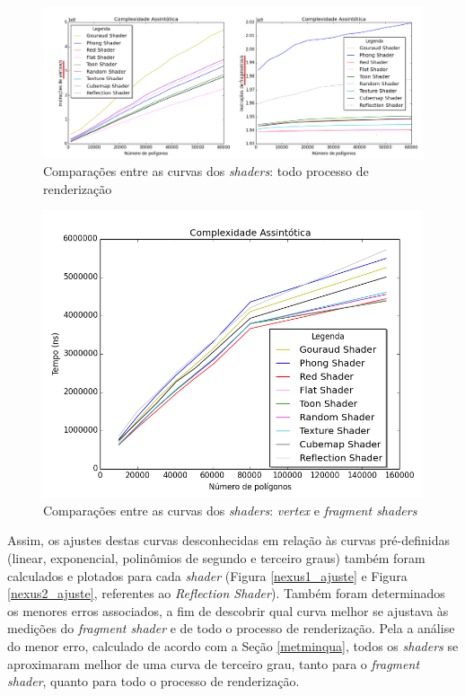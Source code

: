	\begin{figure}[ht]
	\centering
		\includegraphics[keepaspectratio=true,scale=0.4]{figuras/devices_all.png}
	\caption{Comparações entre as curvas dos \textit{shaders}: todo processo de renderização}
	\label{comp_shaders2}
	\end{figure}	

	\begin{figure}[ht]
	\centering
		\includegraphics[keepaspectratio=true,scale=0.5]{figuras/render_time_all.png}
	\caption{Comparações entre as curvas dos \textit{shaders}: \textit{vertex} e \textit{fragment shaders}}
	\label{comp_shaders}
	\end{figure}	


	 Assim, os ajustes destas curvas desconhecidas em relação às curvas pré-definidas (linear, exponencial, polinômios de segundo e terceiro graus) também foram calculados e plotados para cada \textit{shader} (Figura \ref{nexus1_ajuste} e Figura \ref{nexus2_ajuste}, referentes ao \textit{Reflection Shader}). Também foram determinados os menores erros associados, a fim de descobrir qual curva melhor se ajustava às medições do \textit{fragment shader} e de todo o processo de renderização. Pela a análise do menor erro, calculado de acordo com a Seção \ref{metminqua}, todos os \textit{shaders} se aproximaram melhor de uma curva de terceiro grau, tanto para o \textit{fragment shader}, quanto para todo o processo de renderização.
	
